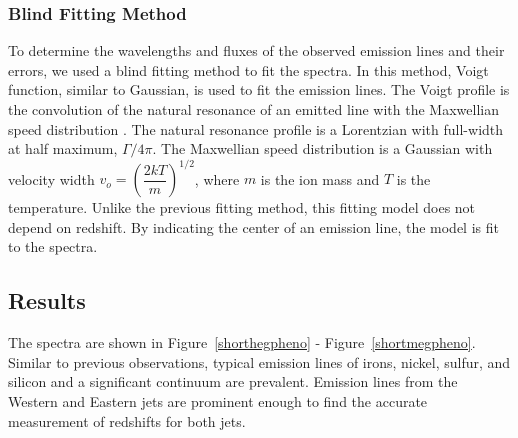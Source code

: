 \subsubsection{Blind Fitting Method}

To determine the wavelengths and fluxes of the observed emission lines and their errors, we used a blind fitting method to fit the spectra. In this method, Voigt function, similar to Gaussian, is used to fit the emission lines. The Voigt profile is the convolution of the natural resonance of an emitted line with the Maxwellian speed distribution \citep{Houck2000}. The natural resonance profile is a Lorentzian with full-width at half maximum, $\Gamma/4\pi$. The Maxwellian speed distribution is a Gaussian with velocity width $v_o = \left(\dfrac{2kT}{m}\right)^{1/2}$, where $m$ is the ion mass and $T$ is the temperature. Unlike the previous fitting method, this fitting model does not depend on redshift. By indicating the center of an emission line, the model is fit to the spectra.

\subsection{Results}

The spectra are shown in Figure~\ref{shorthegpheno} - Figure~\ref{shortmegpheno}. Similar to previous observations, typical emission lines of irons, nickel, sulfur, and silicon and a significant continuum are prevalent. Emission lines from the Western and Eastern jets are prominent enough to find the  accurate measurement of redshifts for both jets. \par

